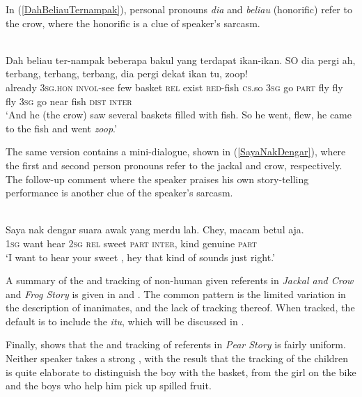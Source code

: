 \documentclass[output=paper
,modfonts
,nonflat]{langsci/langscibook}
\begin{document}
\noindent
In (\ref{DahBeliauTernampak}), personal pronouns \emph{dia} and  \emph{beliau} (honorific) refer to the crow, where the honorific is a clue of speaker's sarcasm.

\ea\label{DahBeliauTernampak} 
\\
\gll 	Dah      {\ob}beliau{\cb}  ter-nampak beberapa bakul  yang terdapat ikan-ikan. SO   {\ob}dia{\cb} pergi ah,    terbang, terbang, terbang,  {\ob}dia{\cb} pergi dekat ikan tu, zoop!\\
already \textsc{3sg.hon} \textsc{invol-}see       few      basket \textsc{rel}  exist    \textsc{red}-fish \textsc{cs.}so \textsc{3sg} go    \textsc{part} fly      fly      fly      \textsc{3sg} go    near  fish \textsc{dist} \textsc{inter}\\
\glt `And he (the crow) saw several baskets filled with fish. So he went, flew, he came to the fish and went \emph{zoop}.'
\z

\noindent
The same version contains a mini-dialogue, shown in (\ref{SayaNakDengar}), where the first and second person pronouns refer to the jackal and crow, respectively. The follow-up comment where the speaker praises his own story-telling performance is another clue of the speaker's sarcasm.

\ea\label{SayaNakDengar} 
\\
\gll 	 {\ob}Saya{\cb} nak  dengar suara  {\ob}awak{\cb} yang merdu lah. Chey, macam betul   aja.\\
\textsc{1sg}  want hear    \textsc{2sg}  \textsc{rel}  sweet \textsc{part} \textsc{inter}, kind  genuine \textsc{part}\\
\glt `I want to hear your sweet , hey that kind of sounds just right.'
\z

\noindent
A summary of the  and tracking of non-human given referents in \emph{Jackal and Crow} and \emph{Frog Story} is given in  and . The common pattern is the limited variation in the description of inanimates, and the lack of tracking thereof. When tracked, the default is to include the  \emph{itu}, which will be discussed in .

Finally,  shows that the  and tracking of referents in \emph{Pear Story} is fairly uniform. Neither speaker takes a strong , with the result that the tracking of the children is quite elaborate to distinguish the boy with the basket, from the girl on the bike and the boys who help him pick up spilled fruit.
\end{document}
